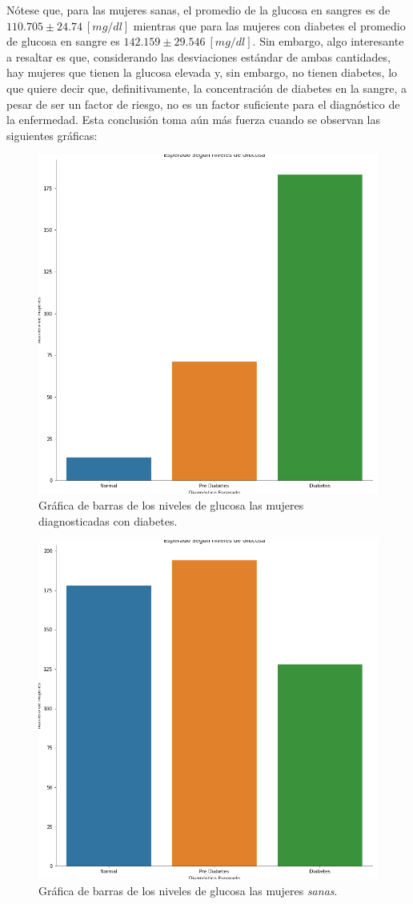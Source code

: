 \documentclass{article}
\begin{document}
Nótese que, para las mujeres sanas, el promedio de la glucosa en sangres es de $110.705\pm24.74\ [mg/dl]$ mientras que  para las mujeres con diabetes el promedio de glucosa en sangre es $142.159\pm29.546\ [mg/dl]$. Sin embargo, algo interesante a resaltar es que, considerando las desviaciones estándar de ambas cantidades, hay mujeres que tienen la glucosa elevada y, sin embargo, no tienen diabetes, lo que quiere decir que, definitivamente, la concentración de diabetes en la sangre, a pesar de ser un factor de riesgo, no es un factor suficiente para el diagnóstico de la enfermedad. Esta conclusión toma aún más fuerza cuando se observan las siguientes gráficas:

\begin{figure}[H]
	\centering
	\includegraphics[width=0.65\linewidth]{glucosa_bar_diabetes.png}
	\caption{Gráfica de barras de los niveles de glucosa las mujeres diagnosticadas con diabetes.}%
	\label{fig:glucosa_bar_diabetes}
\end{figure}

\begin{figure}[H]
	\centering
	\includegraphics[width=0.65\linewidth]{glucosa_bar_sanas.png}
	\caption{Gráfica de barras de los niveles de glucosa las mujeres \emph{sanas}.}%
	\label{fig:glucosa_bar_sanas}
\end{figure}
\end{document}
